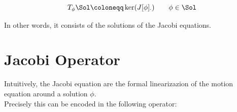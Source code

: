 \documentclass[a4paper,12pt,fleqn]{scrartcl}  %
\begin{document}
	\begin{definition}\label{Def:TangentSol}
		\begin{displaymath}
			T_\phi \Sol \coloneqq \ker(J[\phi]_\cdot) \qquad \phi \in \Sol
		\end{displaymath}
	\end{definition}
In other words, it consists of the solutions of the Jacobi equations.


\clearpage \newpage
\section{Jacobi Operator}\label{Sec:JacobiOperator}
Intuitively, the Jacobi equation are the formal linearizazion of the motion equation around a solution $\phi$.\\
Precisely this can be encoded in the following operator:
\end{document}
